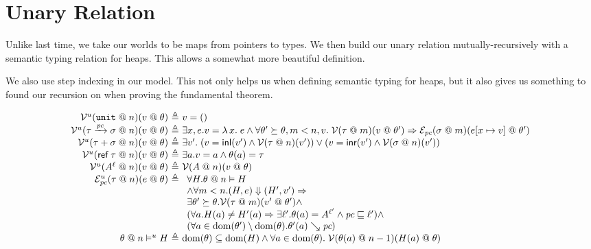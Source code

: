 \documentclass{notes}
\newcommand{\unit}{()}
\newcommand{\Unit}{\texttt{unit}}
\newcommand{\fun}[2]{\lambda\,#1.\;#2}
\newcommand{\inl}[1]{\textsf{inl}(#1)}
\newcommand{\inr}[1]{\textsf{inr}(#1)}
\newcommand{\ptr}[1]{\textsf{ref}\;#1}
\newcommand{\pc}{\textit{pc}}
\newcommand{\dom}{\textrm{dom}}
\begin{document}
\section{Unary Relation}
\label{sec:unary-relation}

Unlike last time, we take our worlds to be maps from pointers to types.
We then build our unary relation mutually-recursively with a semantic typing relation for heaps.
This allows a somewhat more beautiful definition.

We also use step indexing in our model.
This not only helps us when defining semantic typing for heaps, but it also gives us something to found our recursion on when proving the fundamental theorem.

$$
\begin{array}{r@{~\triangleq~}l}
  \mathcal{V}^u(\Unit \mathrel{@} n)(v \mathrel{@} \theta ) & v = \unit\\
  \mathcal{V}^u(\tau \xrightarrow{\pc} \sigma \mathrel{@} n)(v \mathrel{@} \theta) & \exists x, e. v = \fun{x}{e} \land \forall \theta' \succeq \theta, m < n, v.\; \mathcal{V}(\tau \mathrel{@} m)(v \mathrel{@} \theta') \Rightarrow \mathcal{E}_\pc(\sigma \mathrel{@} m)(e[x \mapsto v] \mathrel{@} \theta')\\
  \mathcal{V}^u(\tau + \sigma \mathrel{@} n)(v \mathrel{@} \theta) & \exists v'.\; (v = \inl{v'} \land \mathcal{V}(\tau \mathrel{@} n)(v')) \lor (v = \inr{v'} \land \mathcal{V}(\sigma \mathrel{@} n)(v'))\\
  \mathcal{V}^u(\ptr{\tau} \mathrel{@} n)(v \mathrel{@} \theta) & \exists a. v = a \land \theta(a) = \tau\\
  \mathcal{V}^u(A^\ell \mathrel{@} n)(v \mathrel{@} \theta) & \mathcal{V}(A \mathrel{@} n)(v \mathrel{@} \theta)\\
  \mathcal{E}^u_\pc(\tau \mathrel{@} n)(e \mathrel{@} \theta) &
                                                  \begin{array}[t]{l}
                                                    \forall H. \theta \mathrel{@} n \vDash H \\
                                                    \land \forall m < n. (H, e) \Downarrow (H', v') \Rightarrow\\
                                                    \exists \theta' \succeq \theta. \mathcal{V}(\tau \mathrel{@} m)(v' \mathrel{@} \theta') \land\\
                                                    (\forall a. H(a) \neq H'(a) \Rightarrow \exists \ell'. \theta(a) = A^{\ell'} \land \pc \sqsubseteq \ell') \land\\
                                                    (\forall a \in \mathrm{dom}(\theta') \setminus \mathrm{dom}(\theta). \theta'(a) \searrow \pc)
                                                  \end{array}\\
  \theta \mathrel{@} n \vDash^u  H & \dom(\theta) \subseteq \dom(H) \land \forall a \in\dom(\theta).\; \mathcal{V}(\theta(a) \mathrel{@} n - 1)(H(a) \mathrel{@} \theta)
\end{array}
$$
\end{document}

